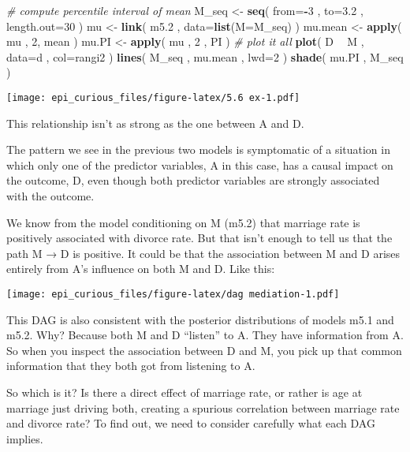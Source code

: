 \documentclass[
]{article}
\newenvironment{Shaded}{\begin{snugshade}}{\end{snugshade}}
\newcommand{\CommentTok}[1]{\textcolor[rgb]{0.56,0.35,0.01}{\textit{#1}}}
\newcommand{\DataTypeTok}[1]{\textcolor[rgb]{0.13,0.29,0.53}{#1}}
\newcommand{\DecValTok}[1]{\textcolor[rgb]{0.00,0.00,0.81}{#1}}
\newcommand{\FloatTok}[1]{\textcolor[rgb]{0.00,0.00,0.81}{#1}}
\newcommand{\KeywordTok}[1]{\textcolor[rgb]{0.13,0.29,0.53}{\textbf{#1}}}
\newcommand{\NormalTok}[1]{#1}
\newcommand{\OperatorTok}[1]{\textcolor[rgb]{0.81,0.36,0.00}{\textbf{#1}}}
\newcommand{\StringTok}[1]{\textcolor[rgb]{0.31,0.60,0.02}{#1}}
\begin{document}
\begin{Shaded}
\begin{Highlighting}[]
\CommentTok{# compute percentile interval of mean}
\NormalTok{M_seq <-}\StringTok{ }\KeywordTok{seq}\NormalTok{( }\DataTypeTok{from=}\OperatorTok{-}\DecValTok{3}\NormalTok{ , }\DataTypeTok{to=}\FloatTok{3.2}\NormalTok{ , }\DataTypeTok{length.out=}\DecValTok{30}\NormalTok{ )}
\NormalTok{mu <-}\StringTok{ }\KeywordTok{link}\NormalTok{( m5}\FloatTok{.2}\NormalTok{ , }\DataTypeTok{data=}\KeywordTok{list}\NormalTok{(}\DataTypeTok{M=}\NormalTok{M_seq) )}
\NormalTok{mu.mean <-}\StringTok{ }\KeywordTok{apply}\NormalTok{( mu , }\DecValTok{2}\NormalTok{, mean )}
\NormalTok{mu.PI <-}\StringTok{ }\KeywordTok{apply}\NormalTok{( mu , }\DecValTok{2}\NormalTok{ , PI )}
\CommentTok{# plot it all}
\KeywordTok{plot}\NormalTok{( D }\OperatorTok{~}\StringTok{ }\NormalTok{M , }\DataTypeTok{data=}\NormalTok{d , }\DataTypeTok{col=}\NormalTok{rangi2 )}
\KeywordTok{lines}\NormalTok{( M_seq , mu.mean , }\DataTypeTok{lwd=}\DecValTok{2}\NormalTok{ )}
\KeywordTok{shade}\NormalTok{( mu.PI , M_seq )}
\end{Highlighting}
\end{Shaded}

\texttt{[image: epi\_curious\_files/figure-latex/5.6 ex-1.pdf]}

This relationship isn't as strong as the one between A and D.

The pattern we see in the previous two models is symptomatic of a
situation in which only one of the predictor variables, A in this case,
has a causal impact on the outcome, D, even though both predictor
variables are strongly associated with the outcome.

We know from the model conditioning on M (m5.2) that marriage rate is
positively associated with divorce rate. But that isn't enough to tell
us that the path M → D is positive. It could be that the association
between M and D arises entirely from A's influence on both M and D. Like
this:

\texttt{[image: epi\_curious\_files/figure-latex/dag mediation-1.pdf]}

This DAG is also consistent with the posterior distributions of models
m5.1 and m5.2. Why? Because both M and D ``listen'' to A. They have
information from A. So when you inspect the association between D and M,
you pick up that common information that they both got from listening to
A.

So which is it? Is there a direct effect of marriage rate, or rather is
age at marriage just driving both, creating a spurious correlation
between marriage rate and divorce rate? To find out, we need to consider
carefully what each DAG implies.
\end{document}
